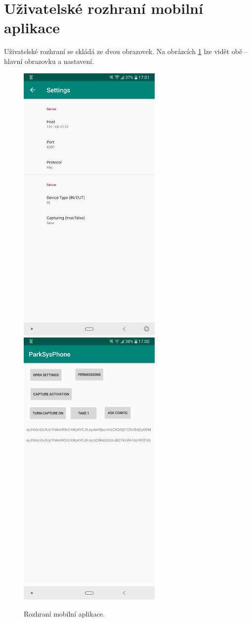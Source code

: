 \section{Uživatelské rozhraní mobilní aplikace}

\noindent
Uživatelské rozhraní se skládá ze dvou obrazovek. Na obrázcích \ref{fig:app_ui}
lze vidět obě -- hlavní obrazovku a nastavení.

\begin{figure}[!htb] \centering
  \includegraphics[width=70mm]{../img/app_settings.png}
  \includegraphics[width=70mm]{../img/app_mainscreen.png}
  \caption{Rozhraní mobilní aplikace.}
  \label{fig:app_ui}
\end{figure}

